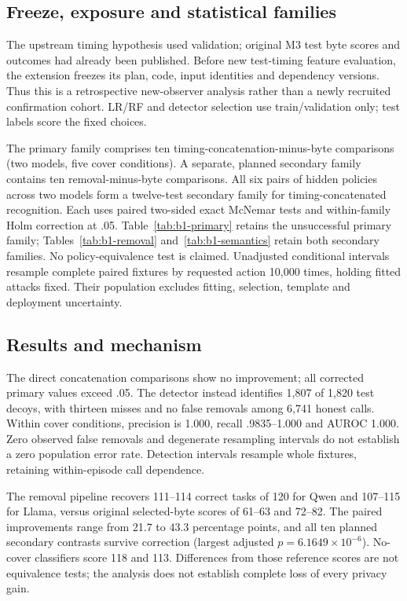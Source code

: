 \subsection{Freeze, exposure and statistical families}
The upstream timing hypothesis used validation; original M3 test byte scores and outcomes had already been published. Before new test-timing feature evaluation, the extension freezes its plan, code, input identities and dependency versions. Thus this is a retrospective new-observer analysis rather than a newly recruited confirmation cohort. LR/RF and detector selection use train/validation only; test labels score the fixed choices.

The primary family comprises ten timing-concatenation-minus-byte comparisons (two models, five cover conditions). A separate, planned secondary family contains ten removal-minus-byte comparisons. All six pairs of hidden policies across two models form a twelve-test secondary family for timing-concatenated recognition. Each uses paired two-sided exact McNemar tests and within-family Holm correction at .05. Table~\ref{tab:b1-primary} retains the unsuccessful primary family; Tables~\ref{tab:b1-removal} and~\ref{tab:b1-semantics} retain both secondary families. No policy-equivalence test is claimed. Unadjusted conditional intervals resample complete paired fixtures by requested action 10,000 times, holding fitted attacks fixed. Their population excludes fitting, selection, template and deployment uncertainty.







\subsection{Results and mechanism}
The direct concatenation comparisons show no improvement; all corrected primary values exceed .05. The detector instead identifies 1,807 of 1,820 test decoys, with thirteen misses and no false removals among 6,741 honest calls. Within cover conditions, precision is 1.000, recall .9835--1.000 and AUROC 1.000. Zero observed false removals and degenerate resampling intervals do not establish a zero population error rate. Detection intervals resample whole fixtures, retaining within-episode call dependence.

The removal pipeline recovers 111--114 correct tasks of 120 for Qwen and 107--115 for Llama, versus original selected-byte scores of 61--63 and 72--82. The paired improvements range from 21.7 to 43.3 percentage points, and all ten planned secondary contrasts survive correction (largest adjusted $p=6.1649\times10^{-6}$). No-cover classifiers score 118 and 113. Differences from those reference scores are not equivalence tests; the analysis does not establish complete loss of every privacy gain.

